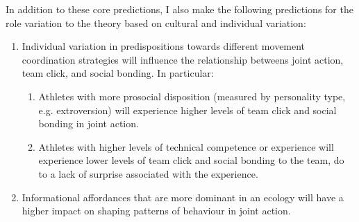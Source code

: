 \begin{CJK}{UTF8}{gbsn}
    In addition to these core predictions, I also make the following predictions for the role variation to the theory based on cultural and individual variation:

    \begin{enumerate}
      \item Individual variation in predispositions towards different movement coordination strategies will influence the relationship betweens joint action, team click, and social bonding.  In particular:
          \begin{enumerate}
            \item Athletes with more prosocial disposition (measured by personality type, e.g. extroversion) will experience higher levels of team click and social bonding in joint action.
            \item Athletes with higher levels of technical competence or experience will experience lower levels of team click and social bonding to the team, do to a lack of surprise associated with the experience.
          \end{enumerate}

      \item Informational affordances that are more dominant in an ecology will have a higher impact on shaping patterns of behaviour in joint action.

    \end{enumerate}











































































  \end{CJK}
